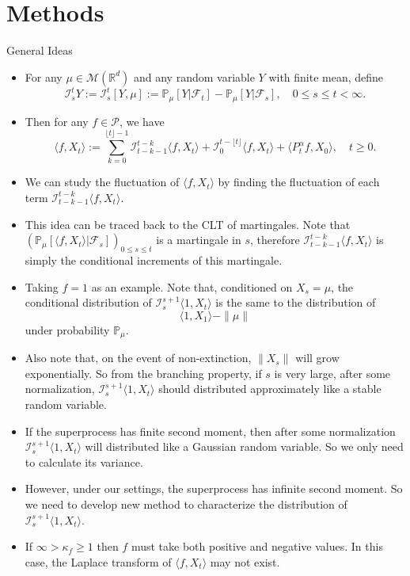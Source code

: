 \documentclass[9pt]{beamer}
\begin{document}
\section{Methods}
\begin{frame}[allowframebreaks]{General Ideas}
\begin{itemize}
\item
	For any $\mu\in  \mathcal M(\mathbb R^d)$ and any random variable $Y$ with finite mean, define
\[
    \mathcal I_s^t Y:=\mathcal I_s^t [Y, \mu]
    := \mathbb P_\mu[Y|\mathcal F_t] - \mathbb P_\mu[Y|\mathcal F_s],\quad 0 \leq s \leq t <\infty.
\]
\item
	Then for any $f\in \mathcal{P}$, we have 
\[
    \langle f,X_t\rangle
    :=\sum_{k=0}^{\lfloor t \rfloor-1} \mathcal I_{t-k-1}^{t-k}\langle f ,X_t\rangle+\mathcal I_0^{t-\lfloor t \rfloor}\langle f ,X_t\rangle + \langle P^\alpha_tf,X_0\rangle,
    \quad t\geq 0.
\]
\item
	We can study the fluctuation of $\langle f,X_t\rangle$ by finding the fluctuation of each term $\mathcal I_{t-k-1}^{t-k}\langle f ,X_t\rangle$.
\item
	This idea can be traced back to the CLT of martingales. 
	Note that $(\mathbb P_\mu[\langle f,X_t\rangle|\mathscr F_s])_{0\leq s\leq t}$ is a martingale in $s$, therefore $\mathcal I_{t-k-1}^{t-k}\langle f ,X_t\rangle$ is simply the conditional increments of this martingale.
\item
	Taking $f = 1$ as an example. Note that, conditioned on $X_s = \mu$, the conditional distribution of $\mathcal I_s^{s+1}\langle 1, X_t\rangle$ is the same to the distribution of 
\[
	\langle 1, X_1\rangle - \|\mu\|
\]
	under probability $\mathbb P_{\mu}$.
\item
	Also note that, on the event of non-extinction, $\|X_s\|$ will grow exponentially.
	So from the branching property, if $s$ is very large, after some normalization, $\mathcal I_s^{s+1}\langle 1, X_t\rangle$ should distributed approximately like a stable random variable.
\item
	If the superprocess has finite second moment, then after some normalization $\mathcal I_s^{s+1}\langle 1, X_t\rangle$ will distributed like a Gaussian random variable. So we only need to calculate its variance.
\item
	However, under our settings, the superprocess has infinite second moment. So we need to develop new method to characterize the distribution of $\mathcal I_s^{s+1}\langle 1, X_t\rangle$.
\item
	If $\infty >\kappa_f \geq 1$ then $f$ must take both positive and negative values. 
	In this case, the Laplace transform of $\langle f,X_t\rangle$ may not exist.
\end{itemize}
\end{frame}
\end{document}
